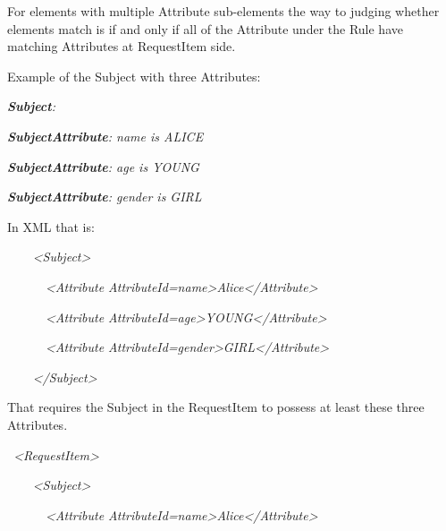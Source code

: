\documentclass{article}
\begin{document}
{\color{black}
For elements with multiple Attribute sub-elements the way to judging
whether elements match is if and only if all of the Attribute under the
Rule have matching Attributes at RequestItem side.}

{\color{black}
Example of the Subject with three Attributes:}

{\upshape\color{black}
\foreignlanguage{english}{\textbf{\textit{Subject}}}\foreignlanguage{english}{\textit{:}}}

{\color{black}
\foreignlanguage{english}{\textbf{\textit{SubjectAttribute}}}\foreignlanguage{english}{\textit{:
name is ALICE}}}

{\color{black}
\foreignlanguage{english}{\textbf{\textit{SubjectAttribute}}}\foreignlanguage{english}{\textit{:
age is YOUNG}}}

{\color{black}
\foreignlanguage{english}{\textbf{\textit{SubjectAttribute}}}\foreignlanguage{english}{\textit{:
gender is GIRL}}}

{\color{black}
In XML that is:}

{\itshape\color{black}
\ \ \ \ {\textless}Subject{\textgreater}}

{\itshape\color{black}
\ \ \ \ \ \ {\textless}Attribute
AttributeId={\textquotedbl}name{\textquotedbl}{\textgreater}Alice{\textless}/Attribute{\textgreater}}

{\itshape\color{black}
\ \ \ \ \ \ {\textless}Attribute
AttributeId={\textquotedbl}age{\textgreater}YOUNG{\textless}/Attribute{\textgreater}}

{\itshape\color{black}
\ \ \ \ \ \ {\textless}Attribute
AttributeId={\textquotedbl}gender{\textgreater}GIRL{\textless}/Attribute{\textgreater}}

{\itshape\color{black}
\ \ \ \ {\textless}/Subject{\textgreater}}

{\color{black}
That requires the Subject in the RequestItem to possess at least these
three Attributes.}

{\itshape\color{black}
\ {\textless}RequestItem{\textgreater}}

{\itshape\color{black}
\ \ \ \ {\textless}Subject{\textgreater}}

{\itshape\color{black}
\ \ \ \ \ \ {\textless}Attribute
AttributeId={\textquotedbl}name{\textquotedbl}{\textgreater}Alice{\textless}/Attribute{\textgreater}}
\end{document}
